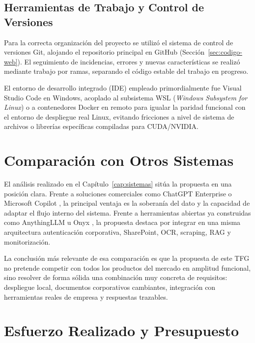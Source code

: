 \subsection{Herramientas de Trabajo y Control de Versiones}

Para la correcta organización del proyecto se utilizó el sistema de control de versiones Git, alojando el repositorio principal en GitHub (Sección~\ref{sec:codigo-web}). El seguimiento de incidencias, errores y nuevas características se realizó mediante trabajo por ramas, separando el código estable del trabajo en progreso.

El entorno de desarrollo integrado (IDE) empleado primordialmente fue Visual Studio Code en Windows, acoplado al subsistema WSL (\textit{Windows Subsystem for Linux}) o a contenedores Docker en remoto para igualar la paridad funcional con el entorno de despliegue real Linux, evitando fricciones a nivel de sistema de archivos o librerías específicas compiladas para CUDA/NVIDIA.

\section{Comparación con Otros Sistemas}

El análisis realizado en el Capítulo~\ref{cap:sistemas} sitúa la propuesta en una posición clara. Frente a soluciones comerciales como ChatGPT Enterprise o Microsoft Copilot \cite{openaiChatgptEnterprise2026,microsoftCopilot3652026}, la principal ventaja es la soberanía del dato y la capacidad de adaptar el flujo interno del sistema. Frente a herramientas abiertas ya construidas como AnythingLLM u Onyx \cite{anythingllm2026docs,onyx2026docs}, la propuesta destaca por integrar en una misma arquitectura autenticación corporativa, SharePoint, OCR, scraping, RAG y monitorización.

La conclusión más relevante de esa comparación es que la propuesta de este TFG no pretende competir con todos los productos del mercado en amplitud funcional, sino resolver de forma sólida una combinación muy concreta de requisitos: despliegue local, documentos corporativos cambiantes, integración con herramientas reales de empresa y respuestas trazables.

\section{Esfuerzo Realizado y Presupuesto}
\label{sec:esfuerzo}

